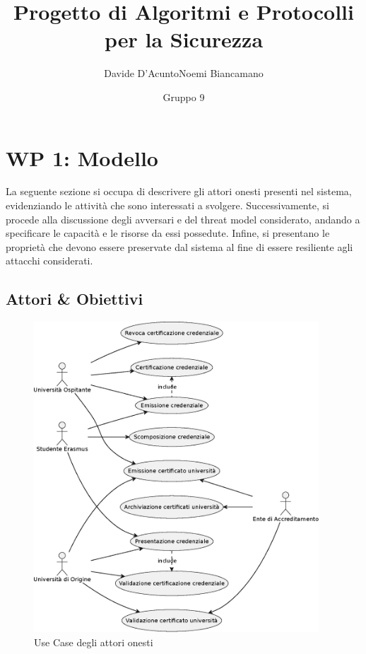 \documentclass[a4paper,12pt]{article}
\title{Progetto di Algoritmi e Protocolli per la Sicurezza}
\author{Davide D'Acunto\quad Noemi Biancamano}
\date{Gruppo 9}
\begin{document}
\maketitle

\tableofcontents
\newpage
\section{WP 1: Modello}
La seguente sezione si occupa di descrivere gli attori onesti presenti nel sistema, evidenziando le attività che sono interessati a svolgere.
\newline Successivamente, si procede alla discussione degli avversari e del threat model considerato, andando a specificare le capacità e le risorse da essi possedute. Infine, si presentano le proprietà che devono essere preservate dal sistema al fine di essere resiliente agli attacchi considerati.
\subsection{Attori \& Obiettivi}
\begin{figure}[H]
    \centering
    \includegraphics[width=0.95\textwidth]{usecase_1.eps}
    \caption{Use Case degli attori onesti}
    \label{fig:usecase1}
    
\end{figure}
\end{document}
